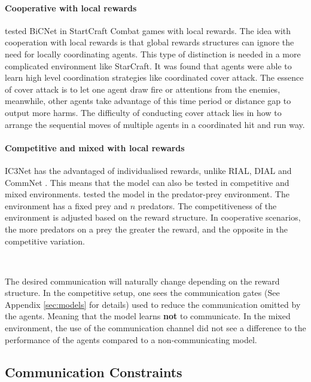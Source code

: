 \documentclass{article}
\begin{document}
\paragraph{Cooperative with local rewards}

\citet{peng2017bicnet} tested BiCNet in StartCraft Combat games with local rewards. The idea with cooperation with local rewards is that global rewards structures can ignore the need for locally coordinating agents. This type of distinction is needed in a more complicated environment like StarCraft. It was found that agents were able to learn high level coordination strategies  like coordinated cover attack. The essence of cover attack is to let one agent draw fire or  attentions from the enemies, meanwhile, other agents take  advantage of this time period or distance gap to output more  harms. The difficulty of conducting cover attack lies in how  to arrange the sequential moves of multiple agents in a coordinated hit and run way. 

\paragraph{Competitive and mixed with local rewards}

IC3Net \citep{singh2018ic3net} has the advantaged of individualised rewards, unlike RIAL, DIAL \citep{foerster2016learning} and CommNet \citep{sukhbaatar2016commnet}. This means that the model can also be tested in competitive and mixed environments. \citet{singh2018ic3net} tested the model in the predator-prey environment. The environment has a fixed prey and $n$ predators. The competitiveness of the environment is adjusted based on the reward structure. In cooperative scenarios, the more predators on a prey the greater the reward, and the opposite in the competitive variation.

\

The desired communication will naturally change depending on the reward structure. In the competitive setup, one sees the communication gates (See Appendix \ref{sec:models} for details) used to reduce the communication omitted by the agents. Meaning that the model learns \textbf{not} to communicate. In the mixed environment, the use of the communication channel did not see a difference to the performance of the agents compared to a non-communicating model.  

\subsection{Communication Constraints}
\end{document}
